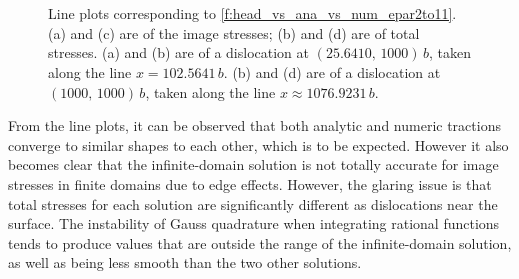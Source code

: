 \documentclass[11pt]{iopart}
\begin{document}
\begin{figure}
    \centering
    ~

    ~

    \caption{Line plots corresponding to \cref{f:head_vs_ana_vs_num_epar2to11}. (a) and (c) are of the image stresses; (b) and (d) are of total stresses. (a) and (b) are of a dislocation at $(25.6410,\, 1000)\, b$, taken along the line $x = 102.5641\, b$. (b) and (d) are of a dislocation at $(1000,\, 1000)\, b$, taken along the line $x \approx 1076.9231\, b$.}
    \label{f:line_head_vs_ana_vs_num_epar2to11}
\end{figure}
From the line plots, it can be observed that both analytic and numeric tractions converge to similar shapes to each other, which is to be expected. However it also becomes clear that the infinite-domain solution is not totally accurate for image stresses in finite domains due to edge effects. However, the glaring issue is that total stresses for each solution are significantly different as dislocations near the surface. The instability of Gauss quadrature when integrating rational functions tends to produce values that are outside the range of the infinite-domain solution, as well as being less smooth than the two other solutions.
\end{document}
